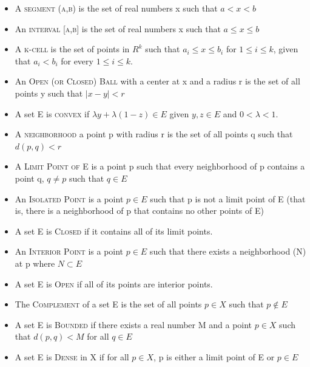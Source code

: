 \documentclass{tufte-book}
\theoremstyle{definition}
\numberwithin{section}{chapter}
\begin{document}
\begin{itemize}

	\item A  \textsc{segment (a,b)} is the set of real numbers x such that  $a<x<b$ 
	\item An \textsc{interval  [a,b]} is the set of real numbers x such that  $a\leq x \leq b$	
	
	\item A \textsc{k-cell} is the set of points in $R^k$ such that  $a_i\leq x \leq b_i$ for $1 \leq i \leq k$, given that $a_i < b_i$ for every $1 \leq i \leq k$.
	\item An \textsc{Open (or Closed) Ball} with a center at x and a radius r is the set of all points y such that $|x-y|< r$
	\item A set E is \textsc{convex} if $\lambda y + \lambda(1-z) \in E$ given $y,z \in E$ and $0< \lambda < 1$.
	\item A \textsc{neighborhood} a point p with radius r is the set of all points q such that $d(p,q) < r$
	
	\item A \textsc{Limit Point of E}  is a point p such that every neighborhood of p contains a point q, $q \neq p$ such that $q \in E$
	\item An \textsc{Isolated Point}  is a point $p\in E$ such that p is not a limit point of E (that is, there is a neighborhood of p that contains no other points of E)
	\item A set E is \textsc{Closed} if it contains all of its limit points.
	\item An \textsc{Interior Point}  is a point $p\in E$ such that there exists a neighborhood (N) at p where $N \subset E$
	\item A set E is \textsc{Open} if all of its points are interior points.   
	\item The \textsc{Complement} of a set E is the set of all points $p \in X$	such that $p \notin E$
	\item A set E is \textsc{Bounded} if there exists a real number M and a point $p \in X$ such that $d(p,q) < M$ for all $q\in E$
	\item A set E is \textsc{Dense} in X if for all $p\in X$, p is either a limit point of E or $p \in E$	
	
	\end{itemize}

\end{document}
